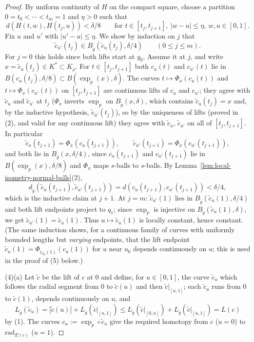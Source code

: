 \begin{proof}
By uniform continuity of $H$ on the compact square, choose a
partition $0=t_0<\cdots<t_m=1$ and $\eta>0$ such that
$$d\left(H(t,w),H(t_j,u)\right)<\delta/8\qquad\text{for }
t\in[t_j,t_{j+1}],\ |w-u|\le\eta,\ w,u\in[0,1].$$
Fix $u$ and $u'$ with $|u'-u|\le\eta$. We show by induction on
$j$ that
$$\tilde c_{u'}(t_j)\in B_{\tilde g}\left(\tilde
c_u(t_j),\delta/4\right)\qquad(0\le j\le m).$$
For $j=0$ this holds since both lifts start at $y_0$. Assume it
at $j$, and write $x=\tilde c_u(t_j)\in K^*\subset K_\rho$. For
$t\in[t_j,t_{j+1}]$ both $c_u(t)$ and $c_{u'}(t)$ lie in
$B(c_u(t_j),\delta/8)\subset B(\exp_p(x),\delta)$. The curves
$t\mapsto\Phi_x\left(c_u(t)\right)$ and
$t\mapsto\Phi_x\left(c_{u'}(t)\right)$ on $[t_j,t_{j+1}]$ are
continuous lifts of $c_u$ and $c_{u'}$; they agree with $\tilde
c_u$ and $\tilde c_{u'}$ at $t_j$ ($\Phi_x$ inverts $\exp_p$ on
$B_{\tilde g}(x,\delta)$, which contains $\tilde c_u(t_j)=x$ and,
by the inductive hypothesis, $\tilde c_{u'}(t_j)$), so by the
uniqueness of lifts (proved in (2), and valid for any continuous
lift) they agree with $\tilde c_u$, $\tilde c_{u'}$ on all of
$[t_j,t_{j+1}]$. In particular
$$\tilde c_u(t_{j+1})=\Phi_x\left(c_u(t_{j+1})\right),\qquad
\tilde c_{u'}(t_{j+1})=\Phi_x\left(c_{u'}(t_{j+1})\right),$$
and both lie in $B_{\tilde g}(x,\delta/4)$, since $c_u(t_{j+1})$
and $c_{u'}(t_{j+1})$ lie in $B(\exp_p(x),\delta/8)$ and $\Phi_x$
maps $s$-balls to $s$-balls. By
Lemma~\ref{lem:local-isometry-normal-balls}(2),
$$d_{\tilde g}\left(\tilde c_u(t_{j+1}),\tilde
c_{u'}(t_{j+1})\right)
=d\left(c_u(t_{j+1}),c_{u'}(t_{j+1})\right)<\delta/4,$$
which is the inductive claim at $j+1$. At $j=m$: $\tilde
c_{u'}(1)$ lies in $B_{\tilde g}(\tilde c_u(1),\delta/4)$ and
both lift endpoints project to $q_1$; since $\exp_p$ is
injective on $B_{\tilde g}(\tilde c_u(1),\delta)$, we get $\tilde
c_{u'}(1)=\tilde c_u(1)$. Thus
$u\mapsto\tilde c_u(1)$ is locally constant, hence constant. (The
same induction shows, for a continuous family of curves with
uniformly bounded lengths but \emph{varying} endpoints, that the
lift endpoint $\tilde c_u(1)=\Phi_{\tilde c_{u_0}(1)}
\left(c_u(1)\right)$ for $u$ near $u_0$ depends continuously on
$u$; this is used in the proof of (5) below.)

(4)(a) Let $\tilde c$ be the lift of $c$ at $0$ and define, for
$u\in[0,1]$, the curve $\tilde c_u$ which follows the radial
segment from $0$ to $\tilde c(u)$ and then $\tilde c|_{[u,1]}$;
each $\tilde c_u$ runs from $0$ to $\tilde c(1)$, depends
continuously on $u$, and
$$L_{\tilde g}(\tilde c_u)=|\tilde c(u)|
+L_{\tilde g}(\tilde c|_{[u,1]})
\le L_{\tilde g}(\tilde c|_{[0,u]})+L_{\tilde g}(\tilde
c|_{[u,1]})=L(c)$$
by (1). The curves $c_u:=\exp_p\circ\tilde c_u$ give the
required homotopy from $c$ ($u=0$) to $\mathrm{rad}_{E(c)}$
($u=1$).


\end{proof}
